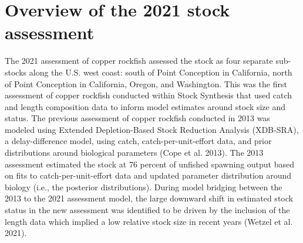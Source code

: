 \documentclass[11pt,
  english,
  a4paper,
]{article}
\begin{document}
\leavevmode\tagmcend\tagstructend\par


\hypertarget{overview-of-the-2021-stock-assessment}{%
\section{Overview of the 2021 stock assessment}\label{overview-of-the-2021-stock-assessment}}

\leavevmode\tagmcend\tagstructend


The 2021 assessment of copper rockfish assessed the stock as four separate sub-stocks along the U.S. west coast: south of Point Conception in California, north of Point Conception in California, Oregon, and Washington. This was the first assessment of copper rockfish conducted within Stock Synthesis that used catch and length composition data to inform model estimates around stock size and status. The previous assessment of copper rockfish conducted in 2013 was modeled using Extended Depletion-Based Stock Reduction Analysis (XDB-SRA), a delay-difference model, using catch, catch-per-unit-effort data, and prior distributions around biological parameters {(Cope et al. 2013)\leavevmode\tagmcend\tagstructend}. The 2013 assessment estimated the stock at 76 percent of unfished spawning output based on fits to catch-per-unit-effort data and updated parameter distribution around biology (i.e., the posterior distributions). During model bridging between the 2013 to the 2021 assessment model, the large downward shift in estimated stock status in the new assessment was identified to be driven by the inclusion of the length data which implied a low relative stock size in recent years {(Wetzel et al. 2021)\leavevmode\tagmcend\tagstructend}.

\leavevmode\tagmcend\tagstructend\par

\end{document}

